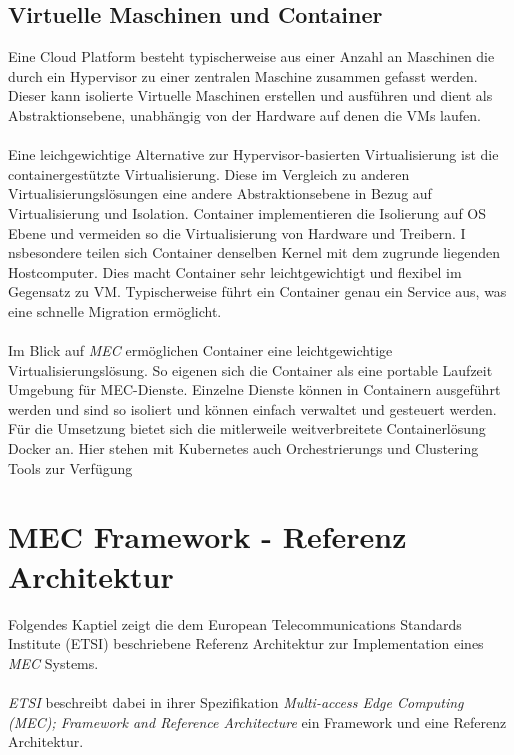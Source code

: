 \documentclass[runningheads]{llncs}
\numberwithin{figure}{section}
\begin{document}
\subsection{Virtuelle Maschinen und Container}
\label{subsec:Virtuelle Maschinen und Container}
Eine Cloud Platform besteht typischerweise aus einer Anzahl an Maschinen die durch ein Hypervisor zu einer zentralen Maschine zusammen gefasst werden.
Dieser kann isolierte Virtuelle Maschinen erstellen und ausführen und dient als Abstraktionsebene, unabhängig von der Hardware auf denen die VMs laufen.
\\
\\
Eine leichgewichtige Alternative zur Hypervisor-basierten Virtualisierung ist die containergestützte Virtualisierung. 
Diese im Vergleich zu anderen Virtualisierungslösungen eine andere  Abstraktionsebene in Bezug auf Virtualisierung und Isolation. 
Container implementieren die Isolierung auf OS Ebene und vermeiden so die Virtualisierung von Hardware und Treibern. I
nsbesondere teilen sich Container denselben Kernel mit dem zugrunde liegenden Hostcomputer. Dies macht Container sehr leichtgewichtigt und flexibel im 
Gegensatz zu VM. Typischerweise führt ein Container genau ein Service aus, was eine schnelle Migration ermöglicht.
\\
\\
Im Blick auf \textit{MEC} ermöglichen Container eine leichtgewichtige Virtualisierungslösung. So eigenen sich die Container
als eine portable Laufzeit Umgebung für MEC-Dienste. Einzelne Dienste können in Containern ausgeführt werden und sind so isoliert und können einfach 
verwaltet und gesteuert werden. Für die Umsetzung bietet sich die mitlerweile weitverbreitete Containerlösung Docker an. Hier stehen mit 
Kubernetes auch Orchestrierungs und Clustering Tools zur Verfügung  \cite{morabitoConsolidateIoTEdge2018}
\newpage
\section{MEC Framework - Referenz Architektur}
\label{subsec:MEC Framework - Referenz Architektur}
Folgendes Kaptiel zeigt die dem European Telecommunications Standards Institute (ETSI) beschriebene
Referenz Architektur zur Implementation eines \textit{MEC} Systems. 
\\ 
\\
\textit{ETSI} beschreibt dabei in ihrer Spezifikation \textit{Multi-access Edge Computing (MEC); 
Framework and Reference Architecture} \cite{etsiETSIGSMEC} ein Framework und eine 
Referenz Architektur.
\end{document}
